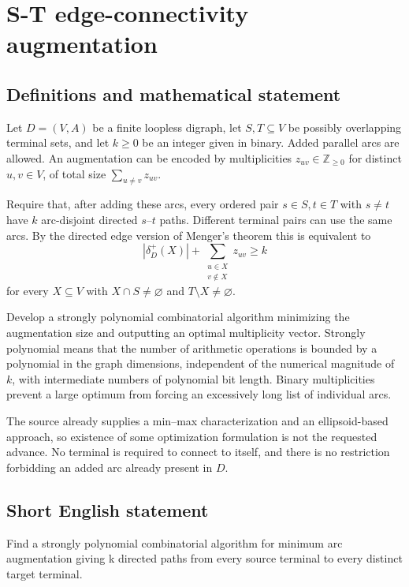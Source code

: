 \documentclass[11pt,a4paper]{article}
\begin{document}
\section*{S-T edge-connectivity augmentation}\label{statement}

\subsection{Definitions and mathematical statement}
Let $D=(V,A)$ be a finite loopless digraph, let $S,T\subseteq V$
be possibly overlapping terminal sets, and let $k\ge0$ be an integer
given in binary. Added parallel arcs are allowed. An augmentation can
be encoded by multiplicities $z_{uv}\in\mathbb Z_{\ge0}$ for distinct
$u,v\in V$, of total size $\sum_{u\ne v}z_{uv}$.

Require that, after adding these arcs, every ordered pair
$s\in S,t\in T$ with $s\ne t$ have $k$ arc-disjoint directed
$s$--$t$ paths. Different terminal pairs can use the same arcs.
By the directed edge version of Menger's theorem this is equivalent to
\[
 |\delta_D^+(X)|+
 \sum_{\substack{u\in X\\v\notin X}}z_{uv}\ge k
\]
for every $X\subseteq V$ with $X\cap S\ne\varnothing$ and
$T\setminus X\ne\varnothing$.

Develop a strongly polynomial combinatorial algorithm minimizing the
augmentation size and outputting an optimal multiplicity vector.
Strongly polynomial means that the number of arithmetic operations
is bounded by a polynomial in the graph dimensions, independent of
the numerical magnitude of $k$, with intermediate numbers of polynomial
bit length. Binary multiplicities prevent a large optimum from forcing
an excessively long list of individual arcs.

The source already supplies a min--max characterization and an
ellipsoid-based approach, so existence of some optimization formulation
is not the requested advance. No terminal is required to connect to
itself, and there is no restriction forbidding an added arc already
present in $D$.
\subsection{Short English statement}
Find a strongly polynomial combinatorial algorithm for minimum arc augmentation giving k directed paths from every source terminal to every distinct target terminal.
\end{document}
